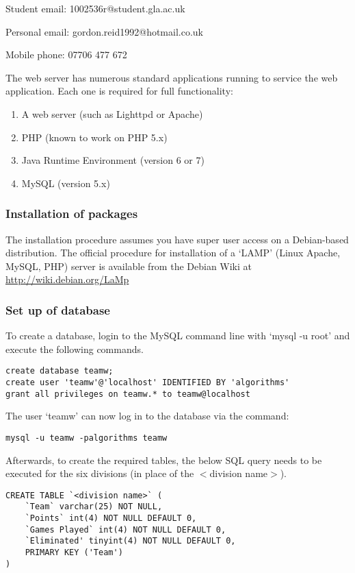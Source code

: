 Student email: 1002536r@student.gla.ac.uk

Personal email: gordon.reid1992@hotmail.co.uk

Mobile phone: 07706 477 672

The web server has numerous standard applications running to service the web
application. Each one is required for full functionality:

\begin{enumerate}
\item A web server (such as Lighttpd or Apache)
\item PHP (known to work on PHP 5.x)
\item Java Runtime Environment (version 6 or 7)
\item MySQL (version 5.x)
\end{enumerate}

\subsubsection{Installation of packages}

The installation procedure assumes you have super user access on a Debian-based
distribution. The official procedure for installation of a `LAMP' (Linux
Apache, MySQL, PHP) server is available from the Debian Wiki at
\url{http://wiki.debian.org/LaMp}

\subsubsection{Set up of database}

To create a database, login to the MySQL command line with `mysql -u root' and
execute the following commands.

\begin{verbatim}
create database teamw;
create user 'teamw'@'localhost' IDENTIFIED BY 'algorithms'
grant all privileges on teamw.* to teamw@localhost
\end{verbatim}

The user `teamw' can now log in to the database via the command:

\begin{verbatim}
mysql -u teamw -palgorithms teamw
\end{verbatim}

Afterwards, to create the required tables, the below SQL query needs to be
executed for the six divisions (in place of the $<$division name$>$).

\begin{verbatim}
CREATE TABLE `<division name>` (
	`Team` varchar(25) NOT NULL,
	`Points` int(4) NOT NULL DEFAULT 0,
	`Games Played` int(4) NOT NULL DEFAULT 0,
	`Eliminated' tinyint(4) NOT NULL DEFAULT 0,
	PRIMARY KEY ('Team')
)
\end{verbatim}

